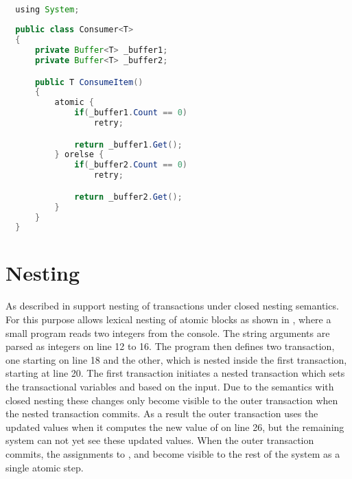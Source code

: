 \begin{lstlisting}[label=lst:stm_atomic_syntax_orelse,
  caption={OrElse Syntax},
  language=Java,  
  showspaces=false,
  showtabs=false,
  breaklines=true,
  showstringspaces=false,
  breakatwhitespace=true,
  commentstyle=\color{greencomments},
  keywordstyle=\color{bluekeywords},
  stringstyle=\color{redstrings},
  morekeywords={atomic, retry, orelse, var, get, set, using}]  % Start your code-block

  using System;
  
  public class Consumer<T>
  {
      private Buffer<T> _buffer1;
      private Buffer<T> _buffer2;

      public T ConsumeItem()
      {
          atomic {
              if(_buffer1.Count == 0)
                  retry;

              return _buffer1.Get();
          } orelse {
              if(_buffer2.Count == 0)
                  retry;

              return _buffer2.Get();
          }
      }
  }
\end{lstlisting}

\section{Nesting}\label{sec:nesting_design}
As described in  \stmnamesp support nesting of transactions under closed nesting semantics. For this purpose \stmnamesp allows lexical nesting of atomic blocks as shown in , where a small program reads two integers from the console. The string arguments are parsed as integers on line 12 to 16. The program then defines two transaction, one starting on line 18 and the other, which is nested inside the first transaction, starting at line 20. The first transaction initiates a nested transaction which sets the transactional variables  and  based on the input. Due to the semantics with closed nesting these changes only become visible to the outer transaction when the nested transaction commits. As a result the outer transaction uses the updated values when it computes the new value of  on line 26, but the remaining system can not yet see these updated values. When the outer transaction commits, the assignments to ,  and  become visible to the rest of the system as a single atomic step.


